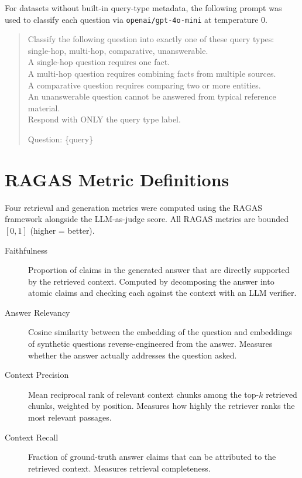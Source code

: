 \documentclass[12pt]{article}
\begin{document}
For datasets without built-in query-type metadata, the following prompt was used
to classify each question via \texttt{openai/gpt-4o-mini} at temperature 0.

\begin{quote}
\small\ttfamily\sloppy
Classify the following question into exactly one of these query types:\\
single-hop, multi-hop, comparative, unanswerable.\\
A single-hop question requires one fact.\\
A multi-hop question requires combining facts from multiple sources.\\
A comparative question requires comparing two or more entities.\\
An unanswerable question cannot be answered from typical reference material.\\
Respond with ONLY the query type label.

\medskip
Question: \{query\}
\end{quote}

\section{RAGAS Metric Definitions}
\label{app:ragas}

Four retrieval and generation metrics were computed using the RAGAS
framework \cite{ragas2023} alongside the LLM-as-judge score. All RAGAS
metrics are bounded $[0, 1]$ (higher = better).

\begin{description}
  \item[Faithfulness] Proportion of claims in the generated answer that are
    directly supported by the retrieved context. Computed by decomposing the
    answer into atomic claims and checking each against the context with an LLM
    verifier.
  \item[Answer Relevancy] Cosine similarity between the embedding of the
    question and embeddings of synthetic questions reverse-engineered from the
    answer. Measures whether the answer actually addresses the question asked.
  \item[Context Precision] Mean reciprocal rank of relevant context chunks
    among the top-$k$ retrieved chunks, weighted by position. Measures how
    highly the retriever ranks the most relevant passages.
  \item[Context Recall] Fraction of ground-truth answer claims that can be
    attributed to the retrieved context. Measures retrieval completeness.
\end{description}
\end{document}
